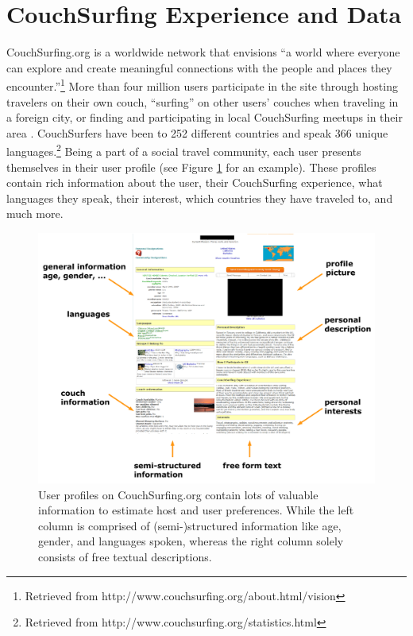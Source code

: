 \section{CouchSurfing Experience and Data} \label{sec:data}

CouchSurfing.org is a worldwide network that envisions ``a world where everyone can explore and create meaningful connections with the people and places they encounter.''\footnote{Retrieved from http://www.couchsurfing.org/about.html/vision}
More than four million users participate in the site through hosting travelers on their own couch, ``surfing'' on other users' couches when traveling in a foreign city, or finding and participating in local CouchSurfing meetups in their area \cite{Lauterbach2009}. CouchSurfers have been to 252 different countries and speak 366 unique languages.\footnote{Retrieved from http://www.couchsurfing.org/statistics.html}
Being a part of a social travel community, each user presents themselves in their user profile (see Figure \ref{fig:csprofile} for an example). These profiles contain rich information about the user, their CouchSurfing experience, what languages they speak, their interest, which countries they have traveled to, and much more.

\begin{figure}[ht]
\centering
\includegraphics[width=1\linewidth]{./figures/csprofile.pdf}
\caption{User profiles on CouchSurfing.org contain lots of valuable information to estimate host and user preferences. While the left column is comprised of (semi-)structured information like age, gender, and languages spoken, whereas the right column solely consists of free textual descriptions.}
\label{fig:csprofile}
\end{figure}

